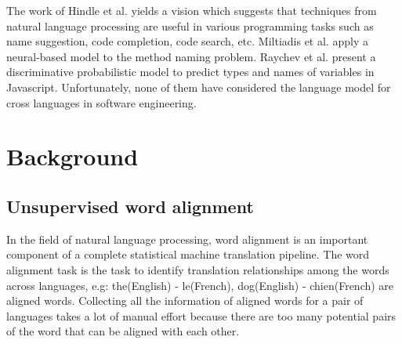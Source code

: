 The work of Hindle et al. \cite{hindle2012naturalness} yields a vision which suggests that techniques from natural language processing are useful in various programming tasks such as name suggestion, code completion, code search, etc. Miltiadis et al. \cite{allamanis2015suggesting} apply a neural-based model to the method naming problem. Raychev et al.\cite{raychev2015predicting} present a discriminative probabilistic model to predict types and names of variables in Javascript. Unfortunately, none of them have considered the language model for cross languages in software engineering.


\section{Background}

\subsection{ Unsupervised word alignment}


In the field of natural language processing, word alignment is an important component of a complete statistical machine translation pipeline. The word alignment task is the task to identify translation relationships among the words across languages, e.g: the(English) - le(French), dog(English) - chien(French) are aligned words. Collecting all the information of aligned words for a pair of languages takes a lot of manual effort because there are too many potential pairs of the word that can be aligned with each other. 

